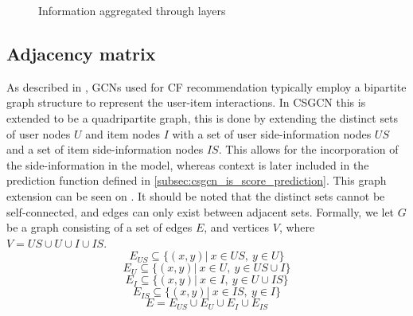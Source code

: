 \begin{figure}[h]

\caption{Information aggregated through layers}
\label{fig:aggregation-for-layers}
\end{figure}

\subsection{Adjacency matrix}\label{subsec:csgcn_is_adj_mat}
As described in , GCNs used for CF recommendation typically employ a bipartite graph structure to represent the user-item interactions.
In CSGCN this is extended to be a quadripartite graph, this is done by extending the distinct sets of user nodes $U$ and item nodes $I$ with a set of user side-information nodes $US$ and a set of item side-information nodes $IS$.
This allows for the incorporation of the side-information in the model, whereas context is later included in the prediction function defined in \autoref{subsec:csgcn_is_score_prediction}.
This graph extension can be seen on .
It should be noted that the distinct sets cannot be self-connected, and edges can only exist between adjacent sets.
Formally, we let $G$ be a graph consisting of a set of edges $E$, and vertices $V$, where $V = US \cup U \cup I \cup IS$.
$$E_{US} \subseteq \{ (x,y) | \: x \in US, \: y \in U  \}$$
$$E_U \subseteq \{ (x,y) | \: x \in U, \: y \in US \cup I \}$$
$$E_I \subseteq \{ (x,y) | \: x \in I, \: y \in U \cup IS \}$$
$$E_{IS} \subseteq \{ (x,y) | \: x \in IS, \: y \in I  \}$$
$$E = E_{US} \cup E_{U} \cup E_{I} \cup E_{IS} $$

